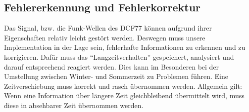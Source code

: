 \subsection{Fehlererkennung und Fehlerkorrektur}
Das Signal, bzw. die Funk-Wellen des DCF77 können aufgrund ihrer Eigenschaften relativ leicht gestört werden.
Deswegen muss unsere Implementation in der Lage sein, fehlerhafte Informationen zu erkennen und zu korrigieren.
Dafür muss das "`Langzeitverhalten"' gespeichert, analysiert und darauf entsprechend reagiert werden.
Dies kann im Besonderen bei der Umstellung zwischen Winter- und Sommerzeit zu Problemen führen.
Eine Zeitverschiebung muss korrekt und rasch übernommen werden.
Allgemein gilt: Wenn eine Information über längere Zeit gleichbleibend übermittelt wird, muss diese in absehbarer Zeit übernommen werden.
